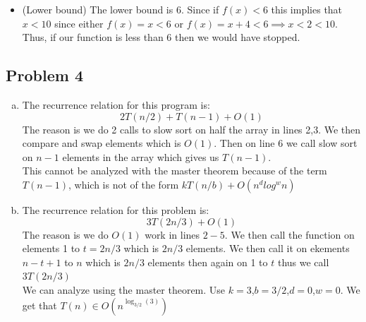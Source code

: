 \documentclass[12pt, letterpaper]{article}
\theoremstyle{definition}
\begin{document}
\begin{enumerate}[(a)]
\begin{itemize}
        \begin{itemize}
            \item If $x_{i-1}$ is odd meaning $x$ on the $i-1$th loop. This implies that $x_i$ is even, since $x_i=x_{i-1}+3$
            \[f(x_i-1)-f(x_i)=x_{i-1}+4-x_i=x_{i-1}+4-x_{i-1}-3=1\]
            \item If $x_{i-1}$ is even
            \begin{itemize}
                \item If $x_i$ is even
                \[f(x_i-1)-f(x_i)=x_{i-1}-x_i=x_{i-1}-x_{i-1}/2=x_{i-1}/2 > 10/2 > 1\]
                \item If $x_i$ is odd
                \[f(x_i-1)-f(x_i)=x_{i-1}-x_i-4=x_{i-1}-x_{i-1}/2-4=x_{i-1}/2-4>10/2-4=1\]
            \end{itemize}
        \end{itemize}
        Thus we decrease by at least one each time since each difference is greater than one.
        \item (Lower bound) The lower bound is $6$. Since if $f(x) < 6$ this implies that $x<10$ since either $f(x)=x<6$ or $f(x)=x+4<6 \implies x<2<10$. Thus, if our function is less than 6 then we would have stopped.
    \end{itemize}
\end{enumerate}

\newpage
\subsection*{Problem 4}
\begin{enumerate}[(a)]
    \item The recurrence relation for this program is:
    \[2T(n/2)+T(n-1)+O(1)\]
    The reason is we do 2 calls to slow sort on half the array in lines 2,3. We then compare and swap elements which is $O(1)$. Then on line 6 we call slow sort on $n-1$ elements in the array which gives us $T(n-1)$.\\
    This cannot be analyzed with the master theorem because of the term $T(n-1)$, which is not of the form $kT(n/b)+O(n^dlog^wn)$
    \item The recurrence relation for this problem is:
    \[3T(2n/3)+O(1)\]
    The reason is we do $O(1)$ work in lines $2-5$. We then call the function on elements 1 to $t=2n/3$ which is $2n/3$ elements. We then call it on ekements $n-t+1$ to $n$ which is $2n/3$ elements then again on 1 to $t$ thus we call $3T(2n/3)$\\
    We can analyze using the master theorem. Use $k=3$,$b=3/2$,$d=0$,$w=0$. We get that $T(n) \in O(n^{\log_{3/2}(3)})$
\end{enumerate}
\end{document}
